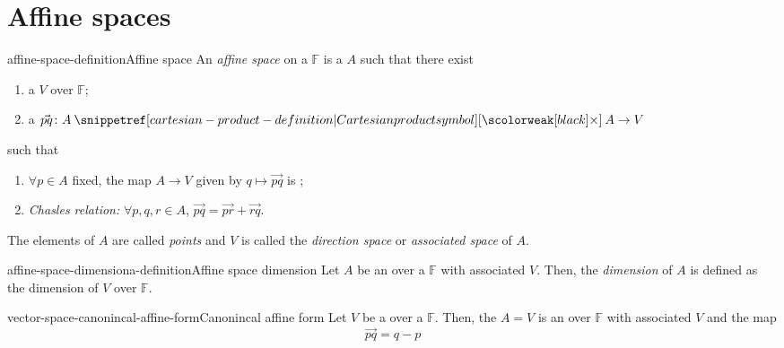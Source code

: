 \documentclass[preview]{standalone}
\begin{document}
\genpage

\section{Affine spaces}


\begin{snippetdefinition}{affine-space-definition}{Affine space}
    An \emph{affine space} on a \field \(\mathbb{F}\) is a \set
    \(A\) such that there exist 
    \begin{enumerate}
        \item a \vectorspace \(V\) over \(\mathbb{F}\);
        \item a \function \(\vec{pq}\colon A \cartesianprod A \to V\)
    \end{enumerate}
    such that
    \begin{enumerate}
        \item \(\forall p \in A\) fixed, the map \(A \to V\) given by \(q \mapsto \vec{pq}\) is \bijective;
        \item \emph{Chasles relation:} \(\forall p, q, r \in A\), \(\vec{pq} = \vec{pr} + \vec{rq}\).
    \end{enumerate}
    The elements of \(A\) are called \emph{points} and \(V\) is called the \emph{direction space} or 
    \emph{associated space} of \(A\).
\end{snippetdefinition}

\begin{snippetdefinition}{affine-space-dimensiona-definition}{Affine space dimension}
    Let \(A\) be an \affinespace over a \field \(\mathbb{F}\) with associated \vectorspace \(V\).
    Then, the \emph{dimension} of \(A\) is defined as the dimension of \(V\) over \(\mathbb{F}\).
\end{snippetdefinition}

\begin{snippetproposition}{vector-space-canonincal-affine-form}{Canonincal affine form}
    Let \(V\) be a \vectorspace over a \field \(\mathbb{F}\).
    Then, the \set \(A = V\) is an \affinespace over \(\mathbb{F}\) with associated \vectorspace \(V\) and the map
    \[
        \vec{pq} = q - p
    \]
\end{snippetproposition}
\end{document}

